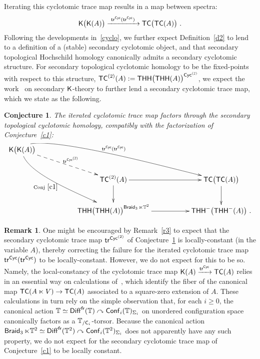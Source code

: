 \documentclass{amsart}
\newtheorem{conj}{Conjecture}
\theoremstyle{definition}
\newtheorem{remark}[theorem]{Remark}
\theoremstyle{remark}
\newcommand{\lacts}{\curvearrowright}
\DeclareMathOperator{\Diff}{{\sf Diff}}
\DeclareMathOperator{\fr}{\sf fr}
\newcommand{\xra}{\xrightarrow}
\DeclareMathOperator{\Braid}{{\sf Braid}_3}
\begin{document}
Iterating this cyclotomic trace map results in a map between spectra:
\[
\sK\bigl( \sK(A) \bigr)
\xra{~{\sf tr}^{\sf Cyc}( {\sf tr}^{\sf Cyc})~}
{\sf TC}\bigl( {\sf TC}(A)\bigr)
~.
\]
Following the developments in~\ref{cyclo}, we further expect Definition~\ref{d2} to lend to a definition of a (stable) secondary cyclotomic object, and that secondary topological Hochschild homology
canonically admits a secondary cyclotomic structure.  
For secondary topological cyclotomic homology to be the fixed-points with respect to this structure, ${\sf TC}^{(2)}(A):={\sf THH}\bigl( {\sf THH}(A) \bigr)^{\sf Cyc^{(2)}}$, we expect the work~\cite{reuben} on secondary $\mathsf K$-theory to further lend a secondary cyclotomic trace map, which we state as the following.
\begin{conj}
\label{c2}
The iterated cyclotomic trace map factors through the secondary topological cyclotomic homology, compatibly with the factorization of Conjecture~\ref{c1}:
\[
\xymatrix{
\sK\bigl(\sK( A) \bigr)
\ar@(d,-)[ddrr]_-{\rm Conj~\ref{c1}}
\ar@{-->}[drr]^-{{\sf tr}^{\sf Cyc^{(2)}}}
\ar@(u,-)[drrrr]^-{~{\sf tr}^{\sf Cyc}( {\sf tr}^{\sf Cyc})~}
&&
&&
\\
&&
{\sf TC}^{(2)}(A)
\ar[rr]
\ar[d]
&&
{\sf TC}\bigl( {\sf TC}(A) \bigr)
\ar[d]
\\
&&
{\sf THH}\bigl( {\sf THH}(A) \bigr)^{ \Braid \ltimes \TT^2 }
\ar[rr]
&&
{\sf THH}^-\bigl( {\sf THH}^-(A) \bigr)
~.
}
\]
\end{conj}


\begin{remark}
One might be encouraged by Remark~\ref{r3} to expect that the secondary cyclotomic trace map ${\sf tr}^{{\sf Cyc}^{(2)}}$ of Conjecture~\ref{c2} is locally-constant (in the variable $A$), thereby correcting the failure for the iterated cyclotomic trace map ${\sf tr}^{\sf Cyc}( {\sf tr}^{\sf Cyc})$ to be locally-constant. 
However, we do not expect for this to be so.
Namely, the local-constancy of the cyclotomic trace map $\sK(A) \xra{{\sf tr}^{\sf Cyc}} {\sf TC}(A)$ relies in an essential way on calculations of~\cite{hesselholt}, which identify the fiber of the canonical map ${\sf TC}(A \ltimes V) \to {\sf TC}(A)$ associated to a square-zero extension of $A$.  
These calculations in turn rely on the simple observation that, for each $i \geq 0$, the canonical action $\TT \simeq \Diff^{\fr}(\TT)\lacts {\sf Conf}_i(\TT)_{\Sigma_i}$ on unordered configuration space canonically factors as a $\mathbb T_{/\mathsf C_i}$-torsor.  
Because the canonical action $\Braid \ltimes \TT^2 \simeq \Diff^{\fr}(\TT^2) \lacts {\sf Conf}_{i}(\TT^2)_{\Sigma_i}$ does not apparently have any such property, 
we do not expect for the secondary cyclotomic trace map of Conjecture~\ref{c1} to be locally constant.  

\end{remark}
\end{document}
